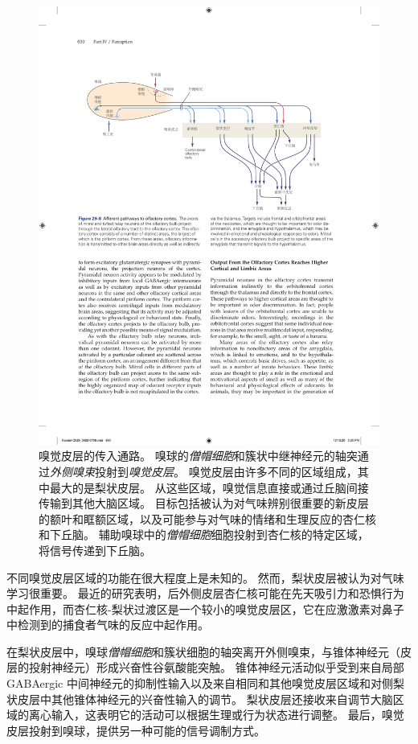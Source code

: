 \begin{figure}[htbp]
	\centering
	\includegraphics[width=0.9\linewidth]{chap29/fig_29_8}
	\caption{嗅觉皮层的传入通路。
		嗅球的\textit{僧帽细胞}和簇状中继神经元的轴突通过\textit{外侧嗅束}投射到\textit{嗅觉皮层}。
		嗅觉皮层由许多不同的区域组成，其中最大的是梨状皮层。
		从这些区域，嗅觉信息直接或通过丘脑间接传输到其他大脑区域。
		目标包括被认为对气味辨别很重要的新皮层的额叶和眶额区域，以及可能参与对气味的情绪和生理反应的杏仁核和下丘脑。
		辅助嗅球中的\textit{僧帽细胞}细胞投射到杏仁核的特定区域，将信号传递到下丘脑。}
	\label{fig:29_8}
\end{figure}


不同嗅觉皮层区域的功能在很大程度上是未知的。
然而，梨状皮层被认为对气味学习很重要。
最近的研究表明，后外侧皮层杏仁核可能在先天吸引力和恐惧行为中起作用，而杏仁核-梨状过渡区是一个较小的嗅觉皮层区，它在应激激素对鼻子中检测到的捕食者气味的反应中起作用。


在梨状皮层中，嗅球\textit{僧帽细胞}和簇状细胞的轴突离开外侧嗅束，与锥体神经元（皮层的投射神经元）形成兴奋性谷氨酸能突触。
锥体神经元活动似乎受到来自局部 GABAergic 中间神经元的抑制性输入以及来自相同和其他嗅觉皮层区域和对侧梨状皮层中其他锥体神经元的兴奋性输入的调节。
梨状皮层还接收来自调节大脑区域的离心输入，这表明它的活动可以根据生理或行为状态进行调整。
最后，嗅觉皮层投射到嗅球，提供另一种可能的信号调制方式。


